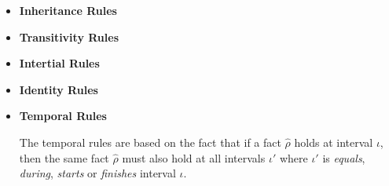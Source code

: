 \documentclass[11pt]{report}
\newenvironment{vquote}
{
  \begin{list}{}{\leftmargin 1em}\item[]
}
{
  \end{list}
}
\begin{document}
\begin{itemize}
            \item
              {\bf Inheritance Rules}
            
            \item
              {\bf Transitivity Rules}
            
            \item
              {\bf Intertial Rules}
            
            \item
              {\bf Identity Rules}
            
            \item
              {\bf Temporal Rules}

              The temporal rules are based on the fact that if a fact
              $\hat{\rho}$ holds at interval $\iota$, then the same fact
              $\hat{\rho}$ must also hold at all intervals $\iota'$ where
              $\iota'$ is {\em equals}, {\em during}, {\em starts} or
              {\em finishes} interval $\iota$.

\end{itemize}
\end{document}
